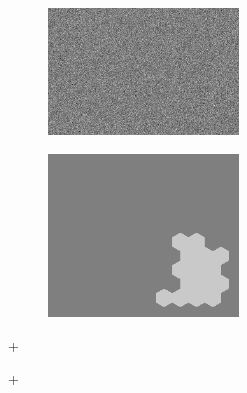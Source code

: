 \documentclass[10pt,xcolor=svgnames]{beamer} %
\begin{document}
\begin{frame}[standout]
\begin{figure}
    \centering
    \includegraphics[width=0.45\textwidth]{pictures/mask.png}
\end{figure}
\end{frame}

\begin{frame}[standout]
\begin{figure}
    \centering
    \includegraphics[width=0.45\textwidth]{pictures/seg_9_cut4.png}
    \label{fig:exp_Seg}
\end{figure}
\end{frame}

\begin{frame}[standout]
+
\end{frame}

\begin{frame}[standout]
\color{black} +
\end{frame}

\begin{frame}[standout]
\end{frame}
\end{document}
